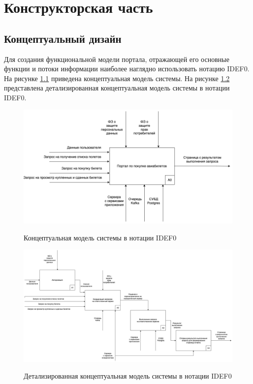 \chapter{Конструкторская часть}

\section{Концептуальный дизайн}
Для создания функциональной модели портала, отражающей его основные функции и потоки информации наиболее наглядно использовать нотацию IDEF0. На рисунке \ref{fig:idef0-0} приведена концептуальная модель системы. На рисунке \ref{fig:idef0-1} представлена детализированная концептуальная модель системы в нотации IDEF0.

\begin{figure}[h!]
	\begin{center}
		{\includegraphics[scale = 0.5, angle=0]{../img/idef0/idef0-0.png}}
		\caption{Концептуальная модель системы в нотации IDEF0}
		\label{fig:idef0-0}
	\end{center}
\end{figure}


\begin{figure}[h!]
	\begin{center}
		{\includegraphics[scale = 0.4, angle=90]{../img/idef0/idef0-1.png}}
		\caption{Детализированная концептуальная модель системы в нотации IDEF0}
		\label{fig:idef0-1}
	\end{center}
\end{figure}


